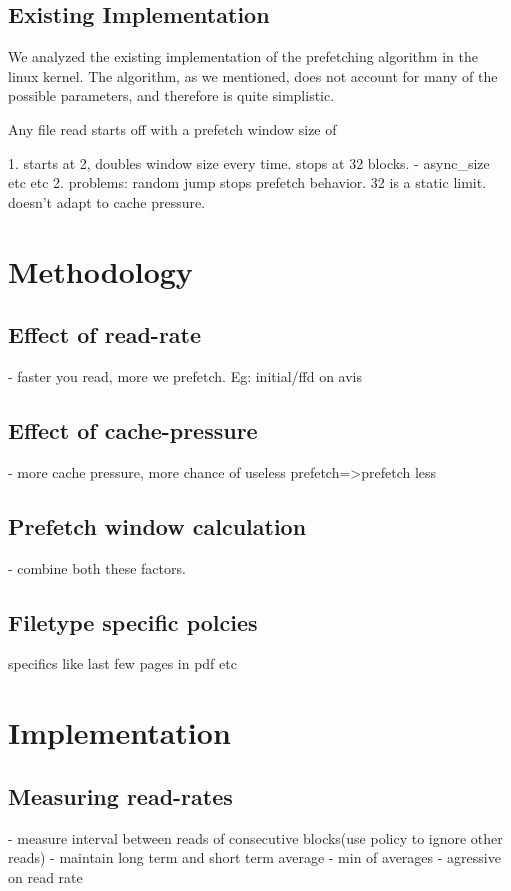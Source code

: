 \documentclass[twocolumn,10pt]{article}
\begin{document}
\subsection{Existing Implementation}

We analyzed the existing implementation of the prefetching algorithm in
the linux kernel. The algorithm, as we mentioned, does not account for
many of the possible parameters, and therefore is quite simplistic.

Any file read starts off with a prefetch window size of 

1. starts at 2, doubles window size every time. stops at 32 blocks.
	- async\_size etc etc
2. problems: random jump stops prefetch behavior. 32 is a static limit. doesn't
adapt to cache pressure.

\section{Methodology}

\subsection{Effect of read-rate}
	- faster you read, more we prefetch. Eg: initial/ffd on avis 

\subsection{Effect of cache-pressure}
	- more cache pressure, more chance of useless prefetch=>prefetch less

\subsection{Prefetch window calculation}
	- combine both these factors.

\subsection{Filetype specific polcies}
	specifics like last few pages in pdf etc

\section{Implementation}

\subsection{Measuring read-rates}
	- measure interval between reads of consecutive blocks(use policy to ignore other reads)
	- maintain long term and short term average
	- min of averages - agressive on read rate
\end{document}
